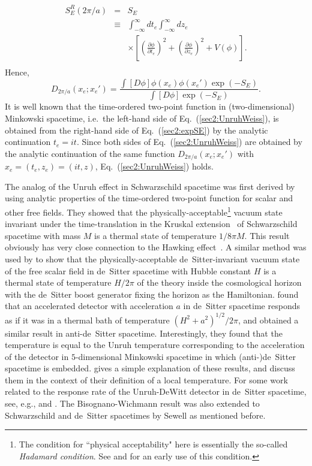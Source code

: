 \documentclass[12pt,nofootinbib,floatfix,aps,prd,showpacs,amsmath,amssymb,eqsecnum]{revtex4-2}
\begin{document}
\begin{eqnarray}
S_E^R(2\pi/a) & = & S_E\nonumber \\
& \equiv & \int_{-\infty}^\infty dt_e \int_{-\infty}^\infty
dz_e\nonumber \\
&& \times \left[ \left(\frac{\partial\phi}{\partial t_e}\right)^2
+ \left(\frac{\partial\phi}{\partial z_e}\right)^2 + V(\phi)\right].
\nonumber \\
\end{eqnarray}
Hence,
\begin{equation}
D_{2\pi/a}(x_e;x_e')
= \frac{\int \left[D\phi\right]\phi(x_e)\phi(x_e')\exp(-S_E)}{
\int\left[D\phi\right] \exp(-S_E)}. \label{sec2:expSE}
\end{equation}
It is well known that the time-ordered two-point function in
(two-dimensional) Minkowski spacetime, i.e.~the left-hand side of
Eq.~(\ref{sec2:UnruhWeiss}), is obtained from the right-hand
side of Eq.~(\ref{sec2:expSE}) 
by the analytic continuation $t_e = it$.  Since both sides of
Eq.~(\ref{sec2:UnruhWeiss}) are obtained by the analytic continuation of
the same function $D_{2\pi/a}(x_e;x_e')$ 
with $x_e = (t_e,z_e) = (it,z)$, Eq.~(\ref{sec2:UnruhWeiss}) holds.

The analog of the Unruh effect in Schwarzschild spacetime
was first derived by
\textcite{Hartleetal76} using analytic properties of the time-ordered 
two-point function for scalar and other free fields.
They showed that the
physically-acceptable\footnote{The condition for ``physical
acceptability" here is essentially 
the so-called {\em Hadamard condition}.  See
\textcite{Wald78} and \textcite{Fullingetal78} 
for an early use of this condition.}
vacuum state invariant under the time-translation in the Kruskal
extension~\cite{Kruskal60} of Schwarzschild spacetime with mass $M$ is
a thermal state of temperature $1/8\pi M$.  
This result obviously has very close connection
to the Hawking effect~\cite{Hawking74}. 
A similar method was used by \textcite{Gibbonsetal77} to show that the
physically-acceptable de~Sitter-invariant vacuum state
of the free scalar field in de~Sitter
spacetime with Hubble constant $H$ is a thermal state of temperature
$H/2\pi$ of the theory inside the cosmological horizon with the
de~Sitter boost generator fixing the horizon as the Hamiltonian.  
\textcite{Narnhoferetal96} found that an accelerated detector with
acceleration $a$ in de~Sitter spacetime responds as if it was in a
thermal bath of temperature $(H^2 + a^2)^{1/2}/2\pi$, and
\textcite{Deseretal97} obtained a similar result in anti-de~Sitter
spacetime.  Interestingly, they found that the temperature is equal to 
the Unruh
temperature corresponding to the 
acceleration of the detector in $5$-dimensional
Minkowski spacetime in which (anti-)de~Sitter spacetime is embedded.
\textcite{Jacobson98} gives a simple explanation of these results, and
\textcite{Buchholzetal07} discuss them in the context of their definition
of a local temperature.  For
some work related to the response rate of the Unruh-DeWitt detector in
de~Sitter spacetime, see, e.g., \textcite{Higuchi87} and
\textcite{Garbrechtetal04a,Garbrechtetal04b}.
The Bisognano-Wichmann result was also extended to Schwarzschild and
de~Sitter spacetimes by Sewell as mentioned before.
\end{document}
